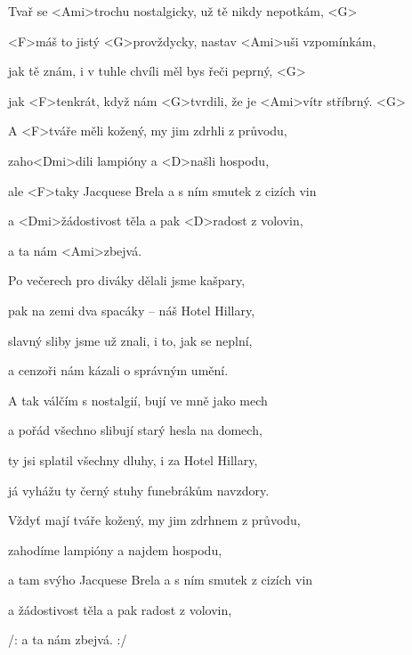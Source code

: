 

\zs
Tvař se <Ami>trochu nostalgicky, už tě nikdy nepotkám, <G>

<F>máš to jistý <G>provždycky, nastav <Ami>uši vzpomínkám,

jak tě znám, i v tuhle chvíli měl bys řeči peprný, <G>

jak <F>tenkrát, když nám <G>tvrdili, že je <Ami>vítr stříbrný. <G>
\ks

\zr
A <F>tváře měli kožený, my jim zdrhli z průvodu,

zaho<Dmi>dili lampióny a <D>našli hospodu,

ale <F>taky Jacquese Brela a s ním smutek z cizích vin

a <Dmi>žádostivost těla a pak <D>radost z volovin,

a ta nám <Ami>zbejvá.
\kr

\zs
Po večerech pro diváky dělali jsme kašpary,

pak na zemi dva spacáky -- náš Hotel Hillary,

slavný sliby jsme už znali, i to, jak se neplní,

a cenzoři nám kázali o správným umění.
\ks

\zr \kr

\zs
A tak válčím s nostalgií, bují ve mně jako mech

a pořád všechno slibují starý hesla na domech,

ty jsi splatil všechny dluhy, i za Hotel Hillary,

já vyhážu ty černý stuhy funebrákům navzdory.
\ks

\zr
Vždyť mají tváře kožený, my jim zdrhnem z průvodu,

zahodíme lampióny a najdem hospodu,

a tam svýho Jacquese Brela a s ním smutek z cizích vin

a žádostivost těla a pak radost z volovin,

/: a ta nám zbejvá. :/
\kr

\kp
